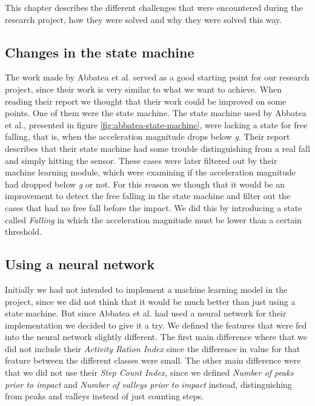 \documentclass[12pt, a4paper, onecolumn]{article}
\begin{document}
	This chapter describes the different challenges that were encountered during the research project, how they were solved and why they were solved this way.
	
	\subsection{Changes in the state machine}
	
	The work made by Abbatea et al. served as a good starting point for our research project, since their work is very similar to what we want to achieve. When reading their report we thought that their work could be improved on some points. One of them were the state machine. The state machine used by Abbatea et al., presented in figure \ref{fig:abbatea-state-machine}, were lacking a state for free falling, that is, when the acceleration magnitude drops below \textit{g}. Their report describes that their state machine had some trouble distinguishing from a real fall and simply hitting the sensor. These cases were later filtered out by their machine learning module, which were examining if the acceleration magnitude had dropped below \textit{g} or not. For this reason we though that it would be an improvement to detect the free falling in the state machine and filter out the cases that had no free fall before the impact. We did this by introducing a state called \textit{Falling} in which the acceleration magnitude must be lower than a certain threshold.
	
	\subsection{Using a neural network}
	
	Initially we had not intended to implement a machine learning model in the project, since we did not think that it would be much better than just using a state machine. But since Abbatea et al. had used a neural network for their implementation we decided to give it a try. We defined the features that were fed into the neural network slightly different. The first main difference where that we did not include their \textit{Activity Ration Index} since the difference in value for that feature between the different classes were small. The other main difference were that we did not use their \textit{Step Count Index}, since we defined \textit{Number of peaks prior to impact} and \textit{Number of valleys prior to impact} instead, distinguishing from peaks and valleys instead of just counting steps. 
	
\end{document}
